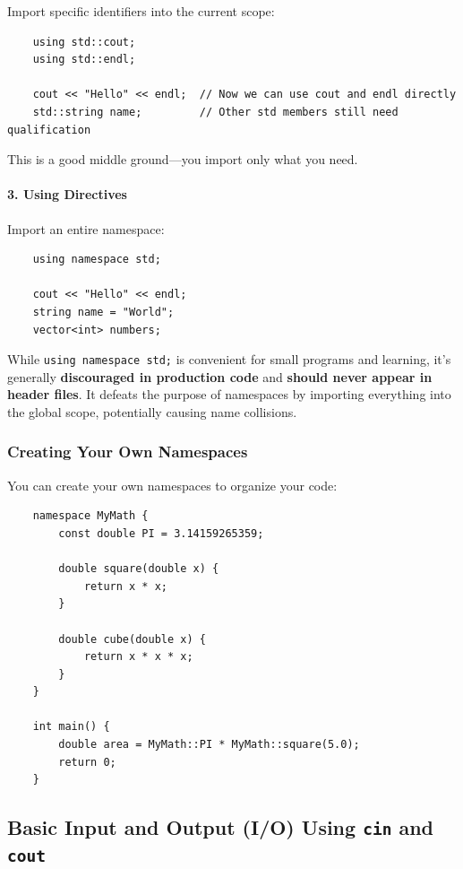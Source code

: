 Import specific identifiers into the current scope:

\begin{lstlisting}
	using std::cout;
	using std::endl;
	
	cout << "Hello" << endl;  // Now we can use cout and endl directly
	std::string name;         // Other std members still need qualification
\end{lstlisting}

This is a good middle ground—you import only what you need.

\paragraph{3. Using Directives}

Import an entire namespace:

\begin{lstlisting}
	using namespace std;
	
	cout << "Hello" << endl;
	string name = "World";
	vector<int> numbers;
\end{lstlisting}

\begin{remark}
	While \texttt{using namespace std;} is convenient for small programs and learning, it's generally \textbf{discouraged in production code} and \textbf{should never appear in header files}. It defeats the purpose of namespaces by importing everything into the global scope, potentially causing name collisions.
\end{remark}

\subsubsection{Creating Your Own Namespaces}

You can create your own namespaces to organize your code:

\begin{lstlisting}
	namespace MyMath {
		const double PI = 3.14159265359;
		
		double square(double x) {
			return x * x;
		}
		
		double cube(double x) {
			return x * x * x;
		}
	}
	
	int main() {
		double area = MyMath::PI * MyMath::square(5.0);
		return 0;
	}
\end{lstlisting}

\subsection{Basic Input and Output (I/O) Using \texttt{cin} and \texttt{cout}}

